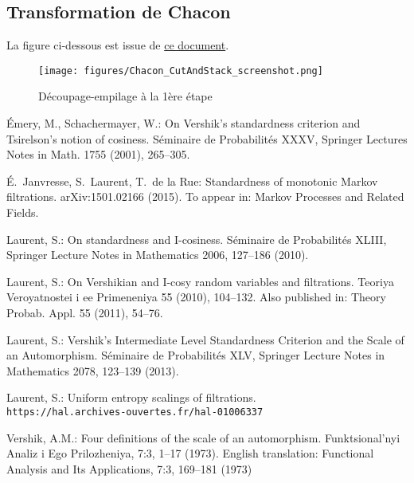 \documentclass[12pt,a4paper]{article}
\begin{document}
\newpage 
\begin{appendices}

\section{Transformation de Chacon}\label{app:transfoChacon}

La figure ci-dessous est issue de \href{https://cdr.lib.unc.edu/indexablecontent/uuid:bfc41b0c-b048-440f-9a57-533e02ea4f76}{ce document}.  

\begin{figure}[!h]
\texttt{[image: figures/Chacon\_CutAndStack\_screenshot.png]} 
\caption{Découpage-empilage à la 1ère étape}
\end{figure}

\end{appendices}


\begin{thebibliography}{99.}

 \'{E}mery, M.,  Schachermayer, W.: 
On Vershik's standardness criterion and Tsirelson's  notion of cosiness. 
 S\'eminaire de Probabilit\'es XXXV,  
Springer Lectures Notes in Math. 1755 (2001), 
265--305.

\'E.~Janvresse, S.~Laurent, T.~de la Rue: 
Standardness of monotonic Markov filtrations. 
	arXiv:1501.02166 (2015). 
To appear in: Markov Processes and Related Fields. 


 Laurent, S.: 
On standardness and I-cosiness. S\'eminaire de Probabilit\'es XLIII, 
Springer Lecture Notes in Mathematics 2006, 
127--186 (2010).

 Laurent, S.: 
On Vershikian and I-cosy random variables and filtrations.
Teoriya Veroyatnostei i ee Primeneniya 55 (2010), 104--132. 
Also published in: Theory Probab. Appl. 55 (2011), 54--76.


Laurent, S.: 
Vershik's Intermediate Level Standardness Criterion and the Scale of an Automorphism. 
S\'eminaire de Probabilit\'es XLV,
Springer Lecture Notes in Mathematics 2078,
123--139 (2013).

Laurent, S.: 
Uniform entropy scalings of filtrations. \\
\verb+https://hal.archives-ouvertes.fr/hal-01006337+ 


Vershik, A.M.: 
Four definitions of the scale of an automorphism. 
Funktsional'nyi Analiz i Ego Prilozheniya, 7:3, 
1--17 (1973). 
English translation:    
Functional Analysis and Its Applications, 7:3, 169--181 (1973)



\end{thebibliography}
\end{document}
